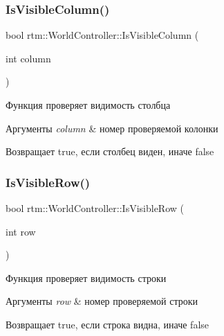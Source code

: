 \subsubsection{\texorpdfstring{Is\+Visible\+Column()}{IsVisibleColumn()}}
{\footnotesize\ttfamily bool rtm\+::\+World\+Controller\+::\+Is\+Visible\+Column (\begin{DoxyParamCaption}\item[{int}]{column }\end{DoxyParamCaption})}



Функция проверяет видимость столбца 


\begin{DoxyParams}{Аргументы}
{\em column} & номер проверяемой колонки \\
\hline
\end{DoxyParams}
\begin{DoxyReturn}{Возвращает}
true, если столбец виден, иначе false 
\end{DoxyReturn}
\mbox{\label{classrtm_1_1_world_controller_a146a82552c4043987b96615547f527be}} 
\subsubsection{\texorpdfstring{Is\+Visible\+Row()}{IsVisibleRow()}}
{\footnotesize\ttfamily bool rtm\+::\+World\+Controller\+::\+Is\+Visible\+Row (\begin{DoxyParamCaption}\item[{int}]{row }\end{DoxyParamCaption})}



Функция проверяет видимость строки 


\begin{DoxyParams}{Аргументы}
{\em row} & номер проверяемой строки \\
\hline
\end{DoxyParams}
\begin{DoxyReturn}{Возвращает}
true, если строка видна, иначе false 
\end{DoxyReturn}
\mbox{\label{classrtm_1_1_world_controller_ae06b54bf542fcd9a30945b6d51048f53}} 
